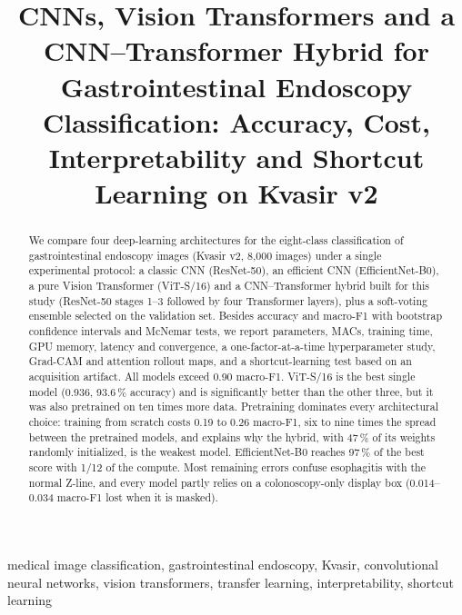 \documentclass[conference]{IEEEtran}
\begin{document}
\title{CNNs, Vision Transformers and a CNN--Transformer Hybrid for Gastrointestinal Endoscopy Classification: Accuracy, Cost, Interpretability and Shortcut Learning on Kvasir v2}

\author{
}

\maketitle

\begin{abstract}
We compare four deep-learning architectures for the eight-class classification of gastrointestinal endoscopy images
(Kvasir v2, 8{,}000 images) under a single experimental protocol: a classic CNN (ResNet-50), an efficient CNN
(EfficientNet-B0), a pure Vision Transformer (ViT-S/16) and a CNN--Transformer hybrid built for this study
(ResNet-50 stages 1--3 followed by four Transformer layers), plus a soft-voting ensemble selected on the validation
set. Besides accuracy and macro-F1 with bootstrap confidence intervals and McNemar tests, we report parameters, MACs,
training time, GPU memory, latency and convergence, a one-factor-at-a-time hyperparameter study, Grad-CAM and attention
rollout maps, and a shortcut-learning test based on an acquisition artifact. All models exceed 0.90 macro-F1. ViT-S/16
is the best single model (0.936, 93.6\,\% accuracy) and is significantly better than the other three, but it was also
pretrained on ten times more data. Pretraining dominates every architectural choice: training from scratch costs 0.19
to 0.26 macro-F1, six to nine times the spread between the pretrained models, and explains why the hybrid, with 47\,\%
of its weights randomly initialized, is the weakest model. EfficientNet-B0 reaches 97\,\% of the best score with
1/12 of the compute. Most remaining errors confuse esophagitis with the normal Z-line, and every model partly relies
on a colonoscopy-only display box (0.014--0.034 macro-F1 lost when it is masked).
\end{abstract}

\begin{IEEEkeywords}
medical image classification, gastrointestinal endoscopy, Kvasir, convolutional neural networks, vision transformers, transfer learning, interpretability, shortcut learning
\end{IEEEkeywords}
\end{document}

